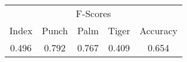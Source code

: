 \documentclass{standalone}
\begin{document}
 
 \begin{tabular}{|c|c|c|c ||c|}
\cline{1-5}\multicolumn{5}{|c|}{F-Scores} \\ 
\cline{1-5}Index & Punch & Palm & Tiger & Accuracy\\ 
\cline{1-5}0.496 & 0.792 & 0.767 & 0.409 & 0.654\\ 
 \cline{1-5}\hline \end{tabular}
 
\end{document}
